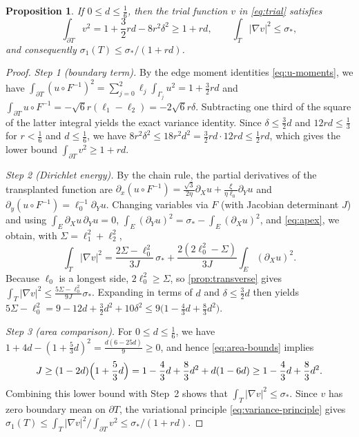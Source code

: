 \documentclass[11pt,reqno]{amsart}
\numberwithin{equation}{section}
\newtheorem{proposition}[proposition]{Proposition}
\theoremstyle{remark}
\begin{document}
\begin{proposition}\label{prop:transplant}
If $0\le d\le\frac16$, then the trial function $v$ in \eqref{eq:trial} satisfies
\[
 \int_{\partial T}v^2=1+\frac32rd-8r^2\delta^2\ge1+rd,\qquad
 \int_T|\nabla v|^2\le\sigma_*,
\]
and consequently $\sigma_1(T)\le\sigma_*/(1+rd)$.
\end{proposition}
\begin{proof}
\emph{Step 1 (boundary term).} By the edge moment identities \eqref{eq:u-moments},
we have $\int_{\partial T}(u\circ F^{-1})^2=\sum_{j=0}^2\ell_j\int_{\Gamma_j}u^2
=1+\frac32rd$ and $\int_{\partial T}u\circ F^{-1}=-\sqrt6r(\ell_1-\ell_2)
=-2\sqrt6r\delta$. Subtracting one third of the square of the latter integral
yields the exact variance identity. Since $\delta\le\frac32d$ and $12rd\le\frac13$
for $r<\frac16$ and $d\le\frac16$, we have
$8r^2\delta^2\le18r^2d^2=\frac32rd\cdot12rd\le\frac12rd$, which gives the lower
bound $\int_{\partial T}v^2\ge1+rd$.

\emph{Step 2 (Dirichlet energy).} By the chain rule, the partial derivatives of
the transplanted function are
$\partial_x(u\circ F^{-1})=\frac{\sqrt3}{2\eta}\partial_Xu+\frac{\xi}{\eta\ell_0}\partial_Yu$
and $\partial_y(u\circ F^{-1})=\ell_0^{-1}\partial_Yu$. Changing variables via $F$
(with Jacobian determinant $J$) and using $\int_E\partial_Xu\,\partial_Yu=0$,
$\int_E(\partial_Yu)^2=\sigma_*-\int_E(\partial_Xu)^2$, and \eqref{eq:apex},
we obtain, with $\Sigma=\ell_1^2+\ell_2^2$,
\begin{equation}\label{eq:energy-exact}
 \int_T|\nabla v|^2=\frac{2\Sigma-\ell_0^2}{3J}\,\sigma_*
 +\frac{2(2\ell_0^2-\Sigma)}{3J}\int_E(\partial_Xu)^2 .
\end{equation}
Because $\ell_0$ is a longest side, $2\ell_0^2\ge\Sigma$, so \cref{prop:transverse}
gives $\int_T|\nabla v|^2\le\frac{5\Sigma-\ell_0^2}{9J}\sigma_*$. Expanding in
terms of $d$ and $\delta\le\frac32d$ then yields
$5\Sigma-\ell_0^2=9-12d+\frac32d^2+10\delta^2\le9\bigl(1-\frac43d+\frac83d^2\bigr)$.

\emph{Step 3 (area comparison).} For $0\le d\le\frac16$, we have
$1+4d-(1+\frac53d)^2=\frac{d(6-25d)}9\ge0$, and hence \eqref{eq:area-bounds} implies
\[
 J\ge(1-2d)\Bigl(1+\frac53d\Bigr)
 =1-\frac43d+\frac83d^2+d(1-6d)\ge1-\frac43d+\frac83d^2 .
\]
Combining this lower bound with Step~2 shows that $\int_T|\nabla v|^2\le\sigma_*$.
Since $v$ has zero boundary mean on $\partial T$, the variational principle
\eqref{eq:variance-principle} gives
$\sigma_1(T)\le\int_T|\nabla v|^2/\int_{\partial T}v^2\le\sigma_*/(1+rd)$.
\end{proof}
\end{document}

